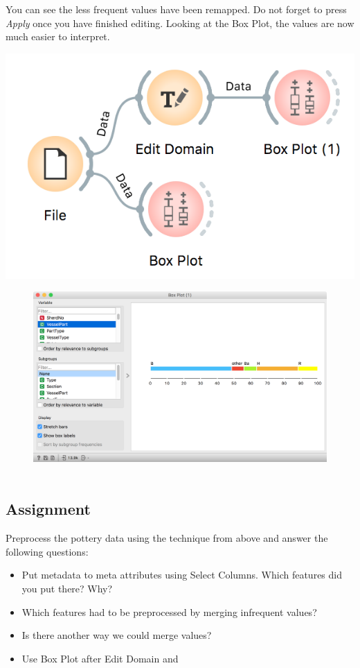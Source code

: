 \newpage

You can see the less frequent values have been remapped. Do not forget to press \textit{Apply} once you have finished editing. Looking at the Box Plot, the values are now much easier to interpret.

\begin{marginfigure}
    \centering
    \includegraphics[scale=0.5]{workflow.png}
\end{marginfigure}

\begin{figure}[h]
    \centering
    \includegraphics[scale=0.35]{box-plot-after.png}
    \caption{$\;$} %
\end{figure}

\subsection{Assignment}

Preprocess the pottery data using the technique from above and answer the following questions:
\begin{itemize}
    \item Put metadata to meta attributes using Select Columns. Which features did you put there? Why?
    \item Which features had to be preprocessed by merging infrequent values?
    \item Is there another way we could merge values?
    \item Use Box Plot after Edit Domain and 
\end{itemize}
